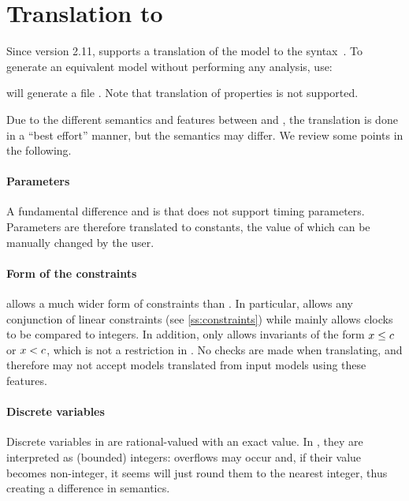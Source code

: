 \section{Translation to \uppaal{}}\label{section:uppaal}

Since version 2.11, \imitator{} supports a translation of the model to the \uppaal{} syntax~\cite{LPY97}.
To generate an equivalent \uppaal{} model without performing any analysis, use:


\imitator{} will generate a file .
Note that translation of properties is not supported.

Due to the different semantics and features between \imitator{} and \uppaal{}, the translation is done in a ``best effort'' manner, but the semantics may differ.
We review some points in the following.

\paragraph{Parameters}
A fundamental difference \imitator{} and \uppaal{} is that \uppaal{} does not support timing parameters.
Parameters are therefore translated to constants, the value of which can be manually changed by the user.

\paragraph{Form of the constraints}
\imitator{} allows a much wider form of constraints than \uppaal{}.
In particular, \imitator{} allows any conjunction of linear constraints (see \cref{ss:constraints}) while \uppaal{} mainly allows clocks to be compared to integers.
In addition, \uppaal{} only allows invariants of the form $x \leq c$ or $x < c$, which is not a restriction in \imitator{}.
No checks are made when translating, and therefore \uppaal{} may not accept models translated from \imitator{} input models using these features.

\paragraph{Discrete variables}
Discrete variables in \imitator{} are rational-valued with an exact value.
In \uppaal{}, they are interpreted as (bounded) integers: overflows may occur and, if their value becomes non-integer, it seems \uppaal{} will just round them to the nearest integer, thus creating a difference in semantics.


